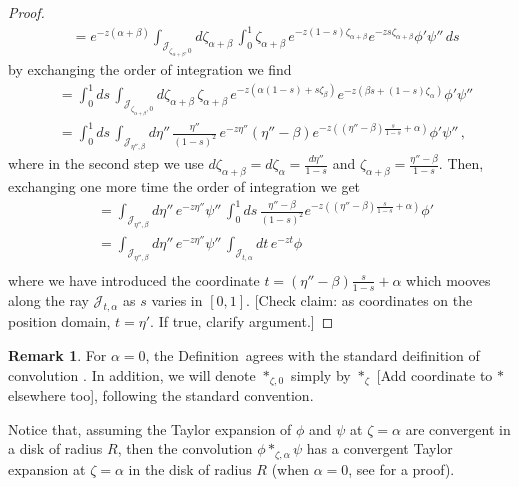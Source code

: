 \documentclass{article}
\theoremstyle{definition}
\newtheorem{remark}[definition]{Remark}
\theoremstyle{plain}
\newenvironment{todo}{\color{Coral}}{\color{black}}
\newenvironment{draft}{\color{SlateBlue}}{\color{black}}
\begin{document}
\begin{proof}
\begin{align*}
       &=e^{-z(\alpha+\beta)}\int_{\mathcal{J}_{\zeta_{\alpha+\beta},0}}d\zeta_{\alpha+\beta}\, \int_0^1 \zeta_{\alpha+\beta}\,e^{-z(1-s)\zeta_{\alpha+\beta}} e^{-z s\zeta_{\alpha+\beta}} \phi' \psi''\,ds 
   \end{align*}
   by exchanging the order of integration we find 
   \begin{align*}
        &=\int_0^1 ds\,\int_{\mathcal{J}_{\zeta_{\alpha+\beta},0}}d\zeta_{\alpha+\beta}\,\zeta_{\alpha+\beta}\,e^{-z(\alpha(1-s)+s\zeta_\beta)} e^{-z(\beta s+(1-s)\zeta_\alpha)} \phi' \psi'' \\
        &=\int_0^1 ds\,\int_{\mathcal{J}_{\eta'',\beta}}d\eta''\,\frac{\eta''}{(1-s)^2}\,e^{-z\eta''} (\eta''-\beta) e^{-z( (\eta''-\beta) \frac{s}{1-s}+\alpha)} \phi' \psi''\,,
   \end{align*}
   where in the second step we use $d\zeta_{\alpha+\beta}=d\zeta_\alpha=\frac{d\eta''}{1-s}$ and $\zeta_{\alpha+\beta}=\frac{\eta''-\beta}{1-s}$. Then, exchanging one more time the order of integration we get
    \begin{align*}
        &=\int_{\mathcal{J}_{\eta'',\beta}}d\eta'' \,e^{-z\eta''}  \psi'' \,\int_0^1 ds\,\frac{\eta''-\beta}{(1-s)^2}e^{-z((\eta''-\beta) \frac{s}{1-s}+\alpha)} \phi'\\
        &=\int_{\mathcal{J}_{\eta'',\beta}}d\eta'' \,e^{-z\eta''}  \psi'' \,\int_{\mathcal{J}_{t,\alpha}} dt\, e^{-zt} \phi\\
   \end{align*}
   where we have introduced the coordinate $t=(\eta''-\beta)\frac{s}{1-s}+\alpha$ which mooves along the ray $\mathcal{J}_{t,\alpha}$ as $s$ varies in $[0,1]$. \begin{todo}[Check claim: as coordinates on the position domain, $t = \eta'$. If true, clarify argument.]\end{todo}
\end{proof}
%
\begin{remark}
For $\alpha=0$, the Definition~\label{def:convolution} agrees with the standard deifinition of convolution \cite[Definition~5.12]{diverg-resurg-i}.
In addition, we will denote $\ast_{\zeta,0}$ simply by \begin{draft}$\ast_\zeta$\end{draft} \begin{todo}[Add coordinate to $\ast$ elsewhere too]\end{todo}, following the standard convention.   
\end{remark}
Notice that, assuming the Taylor expansion of $\phi$ and $\psi$ at $\zeta=\alpha$ are convergent in a disk of radius $R$, then the convolution $\phi\ast_{\zeta,\alpha}\psi$ has a convergent Taylor expansion at $\zeta=\alpha$ in the disk of radius $R$ (when $\alpha=0$, see \cite[Lemma 5.14]{diverg-resurg-i} for a proof).
\end{document}
